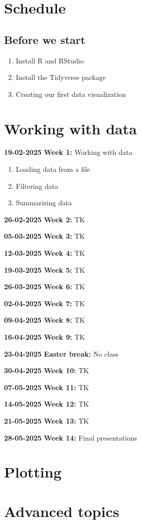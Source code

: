 \documentclass{article}
\newcommand{\week}[3]{
    \begin{center}
        \textbf{#1} \dotfill \textbf{#2:} #3
    \end{center}
}
\begin{document}
\section*{Schedule}

\subsection*{Before we start}
\begin{enumerate}
    \item Install R and RStudio
    \item Install the Tidyverse package
    \item Creating our first data visualization
\end{enumerate}

\section{Working with data}

\week{19-02-2025}{Week 1}{Working with data}

\begin{enumerate}
    \item Loading data from a file
    \item Filtering data
    \item Summarizing data
\end{enumerate}

\week{26-02-2025}{Week 2}{TK}
\week{05-03-2025}{Week 3}{TK}
\week{12-03-2025}{Week 4}{TK}
\week{19-03-2025}{Week 5}{TK}
\week{26-03-2025}{Week 6}{TK}
\week{02-04-2025}{Week 7}{TK}
\week{09-04-2025}{Week 8}{TK}
\week{16-04-2025}{Week 9}{TK}
\week{23-04-2025}{Easter break}{No class}
\week{30-04-2025}{Week 10}{TK}
\week{07-05-2025}{Week 11}{TK}
\week{14-05-2025}{Week 12}{TK}
\week{21-05-2025}{Week 13}{TK}
\week{28-05-2025}{Week 14}{Final presentations}


\section{Plotting}

\section{Advanced topics}
\end{document}
